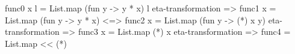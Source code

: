 func0 x l = List.map (fun y -> y * x) l
eta-transformation =>
func1 x  = List.map (fun y -> y * x)
<=>
func2 x = List.map (fun y -> (*) x y)
eta-transformation =>
func3 x = List.map (*) x 
eta-transformation =>
func4 = List.map << (*)
